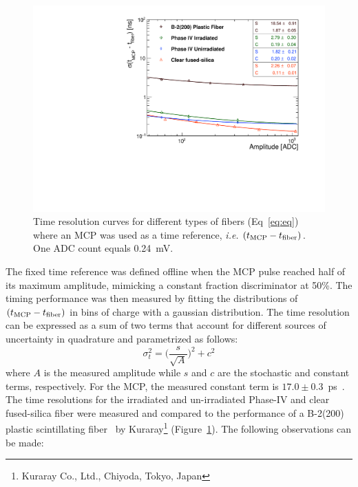 \documentclass[a4paper,11pt]{article}
\begin{document}
\begin{figure}[ht]
\begin{center}
      \includegraphics[width=12cm]{Figures/fibres_time_res}
\caption{\small Time resolution curves for different types of fibers (Eq~\ref{eq:eq}) where an MCP was used as a time reference, {\it i.e.} $(t_{\rm MCP} - t_{\rm fiber})$.  One ADC count equals 0.24~mV.}
    \label{fig:fibres_time_res}
\end{center}
\end{figure}

The fixed time reference was defined offline when the MCP pulse reached half of its maximum amplitude, mimicking a constant fraction discriminator at 50\%. The timing performance was then measured by fitting the distributions of $(t_{\rm MCP} - t_{\rm fiber})$ in bins of charge with a gaussian distribution.  The time resolution can be expressed as a sum of two terms that account for different sources of uncertainty in quadrature and parametrized as follows:
\begin{equation}
    \sigma_t^2 = \bigg( \frac{s}{\sqrt{A}} \bigg)^2 + c^2
    \label{eq:eq}
\end{equation}
where $A$ is the measured amplitude while $s$ and $c$ are the stochastic and constant terms, respectively. For the MCP, the measured constant term is $17.0\pm0.3$~ps~\cite{r-MCP}.  The time resolutions for the irradiated and un-irradiated Phase-IV and clear fused-silica fiber were measured and compared to the performance of a B-2(200) plastic scintillating fiber~\cite{r-B2} by Kuraray\footnote{Kuraray Co., Ltd., Chiyoda, Tokyo, Japan} (Figure~\ref{fig:fibres_time_res}).  The following observations can be made:
\end{document}
